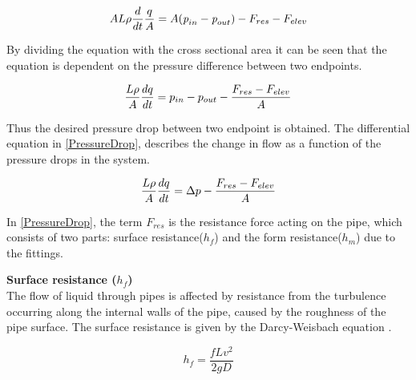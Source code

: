 \begin{equation}
    A L \rho \frac{d}{dt} \frac{q}{A} = A (\textit{p}_{in} -  \textit{p}_{out}) - F_{res} - F_{elev}\\
\end{equation}

By dividing the equation with the cross sectional area it can be seen that the equation is dependent on the pressure difference between two endpoints.

\begin{equation}
    \frac{L \rho}{A} \frac{dq}{dt} =p_{in} - p_{out} - \frac{ F_{res} - F_{elev}}{A} \\
\end{equation}

Thus the desired pressure drop between two endpoint is obtained. The differential equation in \eqref{PressureDrop}, describes the change in flow as a function of the pressure drops in the system.

\begin{equation}
    \frac{L \rho}{A} \frac{dq}{dt} =\Delta p - \frac{ F_{res} - F_{elev}}{A} \\
    \label{PressureDrop}
\end{equation}

In \eqref{PressureDrop}, the term $F_{res}$ is the resistance force acting on the 
pipe, which consists of two parts: surface resistance($h_{f}$) and the form resistance($h_{m}$) due to the fittings. %

\textbf{Surface resistance (\texorpdfstring{$h_f$}{})} \\
The flow of liquid through pipes is affected by resistance from 
the turbulence occurring along the internal walls of the pipe, caused by the roughness of the pipe surface. The surface resistance is given by the Darcy-Weisbach equation \cite{Design_Water}.


\begin{equation}
  h_f = \frac{fLv^2}{2gD}
  \label{Darcy}
\end{equation}

